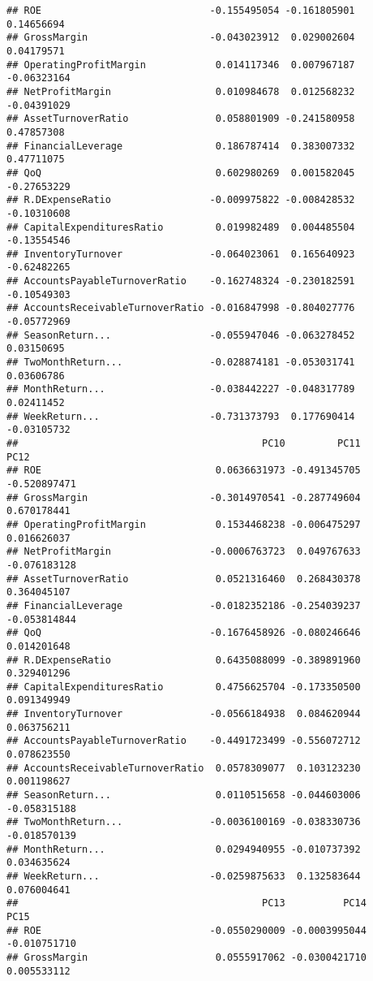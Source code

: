 \documentclass[
]{article}
\begin{document}
\begin{verbatim}
## ROE                             -0.155495054 -0.161805901  0.14656694
## GrossMargin                     -0.043023912  0.029002604  0.04179571
## OperatingProfitMargin            0.014117346  0.007967187 -0.06323164
## NetProfitMargin                  0.010984678  0.012568232 -0.04391029
## AssetTurnoverRatio               0.058801909 -0.241580958  0.47857308
## FinancialLeverage                0.186787414  0.383007332  0.47711075
## QoQ                              0.602980269  0.001582045 -0.27653229
## R.DExpenseRatio                 -0.009975822 -0.008428532 -0.10310608
## CapitalExpendituresRatio         0.019982489  0.004485504 -0.13554546
## InventoryTurnover               -0.064023061  0.165640923 -0.62482265
## AccountsPayableTurnoverRatio    -0.162748324 -0.230182591 -0.10549303
## AccountsReceivableTurnoverRatio -0.016847998 -0.804027776 -0.05772969
## SeasonReturn...                 -0.055947046 -0.063278452  0.03150695
## TwoMonthReturn...               -0.028874181 -0.053031741  0.03606786
## MonthReturn...                  -0.038442227 -0.048317789  0.02411452
## WeekReturn...                   -0.731373793  0.177690414 -0.03105732
##                                          PC10         PC11         PC12
## ROE                              0.0636631973 -0.491345705 -0.520897471
## GrossMargin                     -0.3014970541 -0.287749604  0.670178441
## OperatingProfitMargin            0.1534468238 -0.006475297  0.016626037
## NetProfitMargin                 -0.0006763723  0.049767633 -0.076183128
## AssetTurnoverRatio               0.0521316460  0.268430378  0.364045107
## FinancialLeverage               -0.0182352186 -0.254039237 -0.053814844
## QoQ                             -0.1676458926 -0.080246646  0.014201648
## R.DExpenseRatio                  0.6435088099 -0.389891960  0.329401296
## CapitalExpendituresRatio         0.4756625704 -0.173350500  0.091349949
## InventoryTurnover               -0.0566184938  0.084620944  0.063756211
## AccountsPayableTurnoverRatio    -0.4491723499 -0.556072712  0.078623550
## AccountsReceivableTurnoverRatio  0.0578309077  0.103123230  0.001198627
## SeasonReturn...                  0.0110515658 -0.044603006 -0.058315188
## TwoMonthReturn...               -0.0036100169 -0.038330736 -0.018570139
## MonthReturn...                   0.0294940955 -0.010737392  0.034635624
## WeekReturn...                   -0.0259875633  0.132583644  0.076004641
##                                          PC13          PC14         PC15
## ROE                             -0.0550290009 -0.0003995044 -0.010751710
## GrossMargin                      0.0555917062 -0.0300421710  0.005533112

\end{verbatim}
\end{document}
